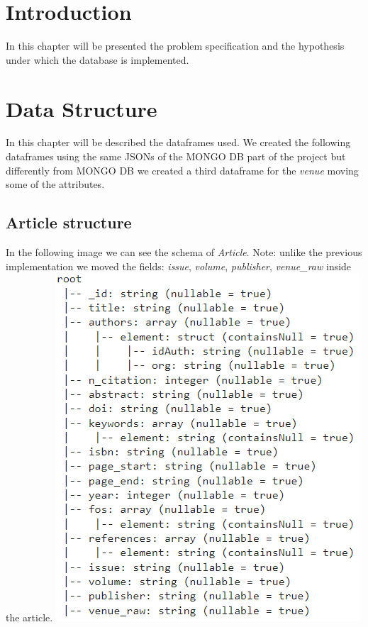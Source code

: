 \documentclass{Configuration_Files/PoliMi3i_thesis}
\begin{document}
\mainmatter %

\chapter{Introduction}
\label{ch:introduction}
In this chapter will be presented the problem specification and the hypothesis under which the database is implemented.


\chapter{Data Structure}
\label{ch:data_struct}
In this chapter will be described the dataframes used. We created the following dataframes using the same JSONs of the MONGO DB part of the project but differently from MONGO DB we created a third dataframe for the \emph{venue} moving some of the attributes.
\section{Article structure}
In the following image we can see the schema of  \emph{Article}.\newline
Note: unlike the previous implementation we moved the fields: \emph{issue}, \emph{volume}, \emph{publisher}, \emph{venue\_raw} inside the article.\newline
\includegraphics{article_schema}
\end{document}
